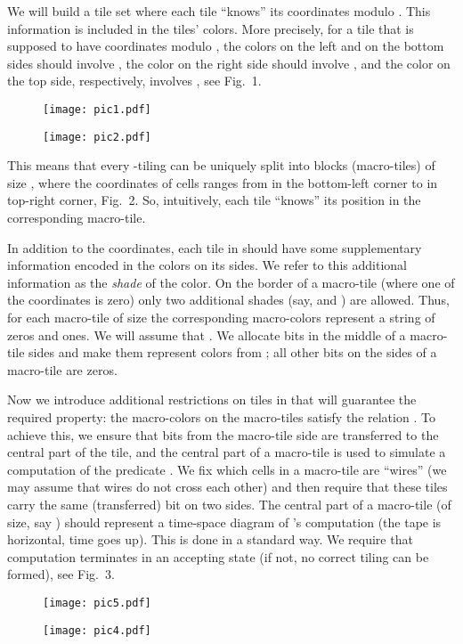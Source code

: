 \documentclass[runningheads]{llncs}
\begin{document}
We will build a tile set  where each tile ``knows'' its coordinates modulo . This information is included in the tiles' colors. More precisely, for a tile that is supposed to have  coordinates  modulo , the colors on the left and on the bottom sides should involve , the color on the right side should involve , and the color on the top side, respectively, involves , see Fig.~1. 
\begin{figure}
\center
\begin{minipage}[b]{0.45\linewidth}
\center
\texttt{[image: pic1.pdf]}
\label{pic1}
\caption{}
\end{minipage}
\begin{minipage}[b]{0.40\linewidth}
\center
\texttt{[image: pic2.pdf]}
\label{pic2}
\caption{}
\end{minipage}
\end{figure}
This means that every -tiling can be uniquely split into blocks (macro-tiles) of size , where the coordinates of cells ranges from  in the bottom-left corner to  in top-right corner, Fig.~2. So,  intuitively, each tile ``knows'' its position in the corresponding macro-tile.


 In addition to the coordinates, each tile in  should have some supplementary information   encoded in the colors on its sides. We refer to this additional information as the \emph{shade} of the color. On the border of a macro-tile (where one of the coordinates is zero) only two additional shades (say,  and ) are allowed. Thus, for each macro-tile of size  the corresponding macro-colors represent a string of  zeros and ones. We will assume that .  We allocate   bits in the middle of a macro-tile sides and make them represent colors from ; all other bits on the sides of a macro-tile are zeros.
  
 Now we introduce additional restrictions on tiles in  that will guarantee the required property:  the macro-colors on the macro-tiles satisfy the relation . To achieve this, we ensure that bits from the macro-tile side are transferred to the central part of the tile, and the central part of a macro-tile is used to simulate  a  computation of the predicate .
We fix which cells in a macro-tile are ``wires'' (we may assume that wires do not cross each other) and then require that these tiles carry the same (transferred) bit on two sides. The central part of a macro-tile (of size, say ) should represent a time-space diagram of 's computation (the tape is horizontal, time goes up). This is done in a standard way. We require that computation terminates in an accepting state (if not, no correct tiling can be formed), see Fig.~3.
\begin{figure}
\center
\begin{minipage}[b]{0.45\linewidth}
\center
\texttt{[image: pic5.pdf]}
\label{pic3}
\caption{}
\end{minipage}
\begin{minipage}[b]{0.45\linewidth}
\center
\texttt{[image: pic4.pdf]}
\label{pic4}
\caption{}
\end{minipage}
\end{figure}
\end{document}
